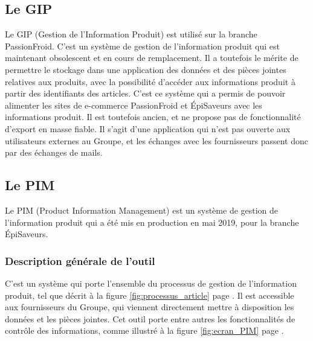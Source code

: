             \subsection{Le GIP}
            \label{GIP}

            Le GIP (Gestion de l'Information Produit) est utilisé sur la branche PassionFroid.
            C'est un système de gestion de l'information produit qui est maintenant obsolescent et en cours de remplacement.
            Il a toutefois le mérite de permettre le stockage dans une application des données et des pièces jointes relatives aux produits, avec la possibilité d'accéder aux informations produit à partir des identifiants des articles.
            C'est ce système qui a permis de pouvoir alimenter les sites de e-commerce PassionFroid et \'{E}piSaveurs avec les informations produit.
            Il est toutefois ancien, et ne propose pas de fonctionnalité d'export en masse fiable.
            Il s'agit d'une application qui n'est pas ouverte aux utilisateurs externes au Groupe, et les échanges avec les fournisseurs passent donc par des échanges de mails.

            \subsection{Le PIM}
            \label{PIM}

            Le PIM (Product Information Management) est un système de gestion de l'information produit qui a été mis en production en mai 2019, pour la branche \'{E}piSaveurs.

                \subsubsection{Description générale de l'outil}

                C'est un système qui porte l'ensemble du processus de gestion de l'information produit, tel que décrit à la figure \ref{fig:processus_article} page \pageref{fig:processus_article}.
                Il est accessible aux fournisseurs du Groupe, qui viennent directement mettre à disposition les données et les pièces jointes.
                Cet outil porte entre autres les fonctionnalités de contrôle des informations, comme illustré à la figure \ref{fig:ecran_PIM} page \pageref{fig:ecran_PIM}.

